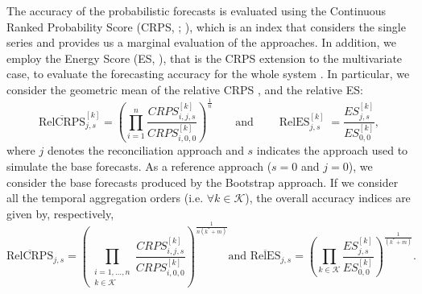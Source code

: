 \documentclass[review, 11pt]{elsarticle}
\newcommand{\xvet}{\bm{x}}
\newcommand{\zvet}{\bm{z}}
\theoremstyle{definition}
\begin{document}
The accuracy of the probabilistic forecasts is evaluated using the Continuous Ranked Probability Score (CRPS, {\color{blue}\citealp{matheson1976ms}}; \citealp{gneiting2014}), %
which is an index that considers the single series and provides us a marginal evaluation of the approaches. In addition, we employ the Energy Score (ES, \citealp{gneiting2014}), that is the CRPS extension to the multivariate case, to evaluate the forecasting accuracy for the whole system \citep{panagiotelis2023, wickramasuriya2021b}.
In particular, we consider the geometric mean of the relative CRPS \citep{fleming1986}, and the relative ES:
\begin{equation}\label{eq:skill}
	\operatorname{\overline{RelCRPS}}_{j,s}^{[k]} = \left(\prod_{i = 1}^n \frac{CRPS^{[k]}_{i, j, s}}{CRPS^{[k]}_{i, 0, 0}}\right)^{\frac{1}{n}} \qquad \mathrm{and} \qquad \operatorname{RelES}_{j,s}^{[k]} = \frac{ES^{[k]}_{j, s}}{ES^{[k]}_{0, 0}},
\end{equation}
where $j$ denotes the reconciliation approach and $s$ indicates the approach used to simulate the base forecasts. As a reference approach ($s=0$ and $j=0$), we consider the base forecasts produce{\color{blue}d} by the Bootstrap approach. If we consider all the temporal aggregation orders (i.e. $\forall k \in \mathcal{K}$), the overall accuracy indices are given by, respectively,
\begin{equation}\label{eq:skill_all}
	\operatorname{\overline{RelCRPS}}_{j,s} = \left(\prod_{\substack{i = 1, \dots, n \\ k \in \mathcal{K}}}\frac{CRPS^{[k]}_{i, j, s}}{CRPS^{[k]}_{i, 0, 0}}\right)^{\frac{1}{n(k^\ast+m)}}\mbox{and } \operatorname{\overline{RelES}}_{j,s}= \left(\prod_{k \in \mathcal{K}}\frac{ES^{[k]}_{j, s}}{ES^{[k]}_{0, 0}}\right)^{\frac{1}{(k^\ast+m)}}.
\end{equation}
\end{document}
